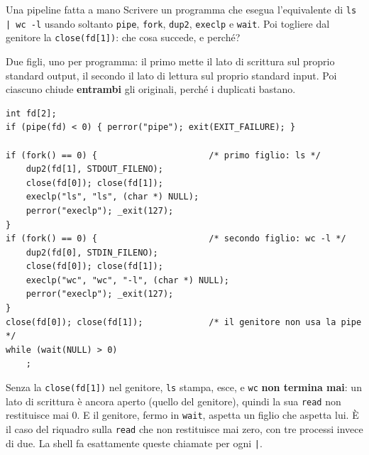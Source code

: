 \begin{esercizio}{Una pipeline fatta a mano}
Scrivere un programma che esegua l'equivalente di \texttt{ls | wc -l} usando soltanto \texttt{pipe}, \texttt{fork},
\texttt{dup2}, \texttt{execlp} e \texttt{wait}. Poi togliere dal genitore la \texttt{close(fd[1])}: che cosa succede, e
perché?

\svolgimento
Due figli, uno per programma: il primo mette il lato di scrittura sul proprio standard output, il secondo il lato di
lettura sul proprio standard input. Poi ciascuno chiude \textbf{entrambi} gli originali, perché i duplicati bastano.

\begin{lstlisting}[language={[POSIX]C}, style=wnumbers, title={pipeline.c}]
int fd[2];
if (pipe(fd) < 0) { perror("pipe"); exit(EXIT_FAILURE); }

if (fork() == 0) {                      /* primo figlio: ls */
    dup2(fd[1], STDOUT_FILENO);
    close(fd[0]); close(fd[1]);
    execlp("ls", "ls", (char *) NULL);
    perror("execlp"); _exit(127);
}
if (fork() == 0) {                      /* secondo figlio: wc -l */
    dup2(fd[0], STDIN_FILENO);
    close(fd[0]); close(fd[1]);
    execlp("wc", "wc", "-l", (char *) NULL);
    perror("execlp"); _exit(127);
}
close(fd[0]); close(fd[1]);             /* il genitore non usa la pipe */
while (wait(NULL) > 0)
    ;
\end{lstlisting}

Senza la \texttt{close(fd[1])} nel genitore, \texttt{ls} stampa, esce, e \texttt{wc} \textbf{non termina mai}: un lato di
scrittura è ancora aperto (quello del genitore), quindi la sua \texttt{read} non restituisce mai 0. E il genitore, fermo
in \texttt{wait}, aspetta un figlio che aspetta lui. È il caso del riquadro sulla \texttt{read} che non restituisce mai
zero, con tre processi invece di due. La shell fa esattamente queste chiamate per ogni \texttt{|}.
\end{esercizio}

